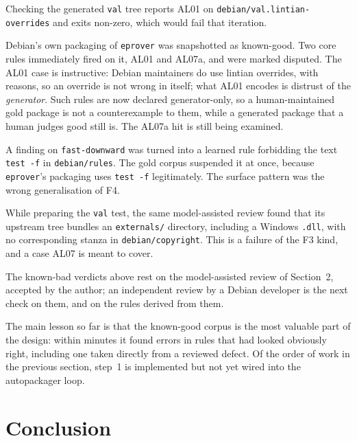 \documentclass[11pt]{article}
\newcommand{\pkg}[1]{\texttt{#1}}
\newcommand{\file}[1]{\texttt{#1}}
\begin{document}
\begin{description}[style=nextline,leftmargin=1.5em]
\item[F2 is caught.] Checking the generated \pkg{val} tree reports AL01
  on \file{debian/val.lintian-overrides} and exits non-zero, which would
  fail that iteration.
\item[The gold corpus checks the checker.] Debian's own packaging of
  \pkg{eprover} was snapshotted as known-good. Two core rules immediately
  fired on it, AL01 and AL07a, and were marked disputed. The AL01 case is
  instructive: Debian maintainers do use lintian overrides, with reasons,
  so an override is not wrong in itself; what AL01 encodes is distrust of
  the \emph{generator}. Such rules are now declared generator-only, so a
  human-maintained gold package is not a counterexample to them, while a
  generated package that a human judges good still is. The AL07a hit is
  still being examined.
\item[Blunt learned rules are demoted.] A finding on \pkg{fast-downward}
  was turned into a learned rule forbidding the text \mbox{\texttt{test -f}} in
  \file{debian/rules}. The gold corpus suspended it at once, because
  \pkg{eprover}'s packaging uses \mbox{\texttt{test -f}} legitimately. The
  surface pattern was the wrong generalisation of F4.
\item[A fifth defect.] While preparing the \pkg{val} test, the same
  model-assisted review found that its upstream tree bundles an \file{externals/} directory,
  including a Windows \file{.dll}, with no corresponding stanza in
  \file{debian/copyright}. This is a failure of the F3 kind, and a case
  AL07 is meant to cover.
\end{description}

\noindent The known-bad verdicts above rest on the model-assisted review
of Section~2, accepted by the author; an independent review by a Debian
developer is the next check on them, and on the rules derived from them.

\noindent The main lesson so far is that the known-good corpus is the most
valuable part of the design: within minutes it found errors in rules that
had looked obviously right, including one taken directly from a reviewed
defect. Of the order of work in the previous section, step~1 is
implemented but not yet wired into the autopackager loop.

\section{Conclusion}
\end{document}
